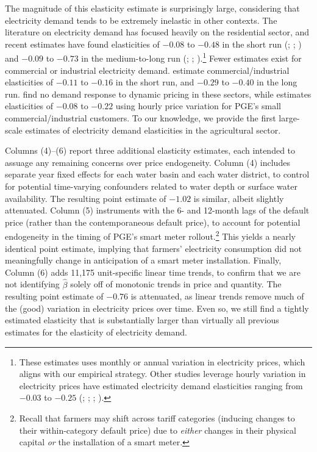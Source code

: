 The magnitude of this elasticity estimate is surprisingly large, considering that electricity demand tends to be extremely inelastic in other contexts.
The literature on electricity demand has focused heavily on the residential sector, and recent estimates have found elasticities of $-0.08$ to $-0.48$ in the short run (\textcite{reiss2005}; \textcite{alberini2011}; \textcite{fell2014}) and $-0.09$ to $-0.73$ in the medium-to-long run (\textcite{alberini2011}; \textcite{ito2014}; \textcite{deryugina2018}).\footnote{
These estimates uses monthly or annual variation in electricity prices, which aligns with our empirical strategy. Other studies leverage hourly variation in electricity prices have estimated electricity demand elasticities ranging from $-0.03$ to $-0.25$ (\textcite{wolak2011}; \textcite{jessoe2014}; \textcite{fowlie2018}; \textcite{ito2018}).} 
Fewer  estimates exist for commercial or industrial electricity demand. \textcite{paul2009} estimate commercial/industrial elasticities of $-0.11$ to $-0.16$ in the short run, and $-0.29$ to $-0.40$ in the long run. \textcite{jessoe2015} find no demand response to dynamic pricing in these sectors, while \textcite{blonz2016} estimates elasticities of $-0.08$ to $-0.22$ using hourly price variation for PGE's small commercial/industrial customers.
To our knowledge, we provide the first large-scale estimates of electricity demand elasticities in the agricultural sector.


Columns (4)--(6) report three additional elasticity estimates, each intended to assuage any remaining concerns over price endogeneity. Column (4)  includes separate year fixed effects for each water basin and each water district, to control for potential time-varying confounders related to water depth or surface water availability. The resulting point estimate of $-1.02$ is similar, albeit slightly attenuated. Column (5) instruments with the 6- and 12-month lags of the default price (rather than the contemporaneous default price), to account for potential endogeneity in the timing of PGE's smart meter rollout.\footnote{
Recall that farmers may shift across tariff categories (inducing changes to their within-category default price) due to \emph{either} changes in their physical capital \emph{or} the installation of a smart meter.
} This yields a nearly identical point estimate, implying that farmers' electricity consumption did not meaningfully change in anticipation of a smart meter installation. Finally, Column (6) adds 11,175 unit-specific linear time trends, to confirm that we are not identifying $\hat \beta$ solely off of monotonic trends in price and quantity. The resulting point estimate of $-0.76$ is attenuated, as linear trends remove much of the (good) variation in electricity prices over time. Even so, we still find a tightly estimated elasticity that is substantially larger than virtually all previous estimates for the elasticity of electricity demand.


